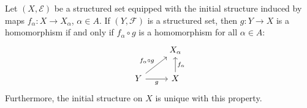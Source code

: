 \documentclass[article, a4paper, 11pt, oneside]{memoir}
\numberwithin{equation}{chapter}
\newcommand{\calE}{\mathcal{E}}
\newcommand{\calF}{\mathcal{F}}
\begin{document}
\begin{theorem}
    \label{thm:initial_characteristic_property}
    Let $(X,\calE)$ be a structured set equipped with the initial structure induced by maps $f_\alpha \colon X \to X_\alpha$,  $\alpha \in A$. If $(Y,\calF)$ is a structured set, then $g \colon Y \to X$ is a homomorphism if and only if $f_\alpha \circ g$ is a homomorphism for all $\alpha \in A$:
    \begin{equation*}
        \begin{tikzcd}
            & X_\alpha \\
            Y
                \ar[r, "g", swap]
                \ar[ur, "f_\alpha \circ g"]
            & X
                \ar[u, "f_\alpha", swap]
        \end{tikzcd}
    \end{equation*}
    Furthermore, the initial structure on $X$ is unique with this property.
\end{theorem}
\end{document}
